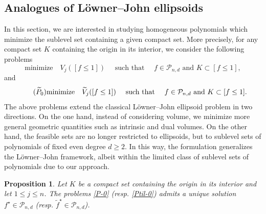 \documentclass[11pt]{article}
\newtheorem{proposition}[theorem]{Proposition}
\theoremstyle{definition}
\numberwithin{equation}{section}
\newcommand{\cP}{\mathcal{P}}        %
\begin{document}
\subsection{Analogues of L\"owner--John ellipsoids}
In this section, we are interested in studying homogeneous polynomials which minimize the sublevel set containing a given compact set. 
More precisely, for any compact set $K$ containing the origin in its interior, we consider the following problems
\begin{equation}\tag{$P_0$}\label{P-0}
    \text{minimize} \quad V_j([f \leq 1]) \quad \text{ such that } \quad f \in \cP_{n, d} \text{ and }K \subset [f \leq 1],
\end{equation}
and
\begin{equation}\tag{$\widetilde{P}_0$}\label{Ptil-0}
    \text{minimize} \quad \widetilde V_j([f \leq 1]) \quad \text{ such that } \quad f \in \cP_{n, d} \text{ and }K \subset [f \leq 1].
\end{equation}
The above problems extend the classical L\"owner--John ellipsoid problem in two directions.
On the one hand, instead of considering volume, we minimize more general geometric quantities such as intrinsic and dual volumes. 
On the other hand, the feasible sets are no longer restricted to ellipsoids, but to sublevel sets of polynomials of fixed even degree $d \ge 2$.
In this way, the formulation generalizes the Löwner–John framework, albeit within the limited class of sublevel sets of polynomials due to our approach.

\begin{proposition}\label{prop.exi-uni-JOHN}
    Let $K$ be a compact set containing the origin in its interior and let $1 \leq j \leq n$.
   The problems \eqref{P-0} (resp. \eqref{Ptil-0}) admits a unique solution $f^\star \in \cP_{n, d}$ (resp. $\widetilde{f}^\star \in \cP_{n, d}$).
\end{proposition}
\end{document}
